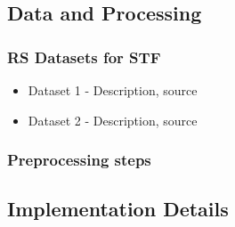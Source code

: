 \begin{multicols}{2}

\subsection{Data and Processing}
\subsubsection{RS Datasets for STF}
    \begin{itemize}
        \item Dataset 1 - Description, source
        \item Dataset 2 - Description, source
    \end{itemize}
\subsubsection{Preprocessing steps}
    

\subsection{Implementation Details}

\end{multicols}
